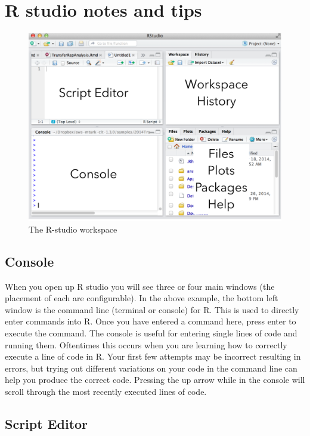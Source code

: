 \documentclass[]{book}
\theoremstyle{definition}
\theoremstyle{definition}
\theoremstyle{definition}
\theoremstyle{remark}
\begin{document}
\section{R studio notes and tips}\label{r-studio-notes-and-tips}

\begin{figure}[htbp]
\centering
\includegraphics{figures/FigRstudio.pdf}
\caption{\label{fig:2rstudiod}The R-studio workspace}
\end{figure}

\subsection{Console}\label{console}

When you open up R studio you will see three or four main windows (the
placement of each are configurable). In the above example, the bottom
left window is the command line (terminal or console) for R. This is
used to directly enter commands into R. Once you have entered a command
here, press enter to execute the command. The console is useful for
entering single lines of code and running them. Oftentimes this occurs
when you are learning how to correctly execute a line of code in R. Your
first few attempts may be incorrect resulting in errors, but trying out
different variations on your code in the command line can help you
produce the correct code. Pressing the up arrow while in the console
will scroll through the most recently executed lines of code.

\subsection{Script Editor}\label{script-editor}
\end{document}
